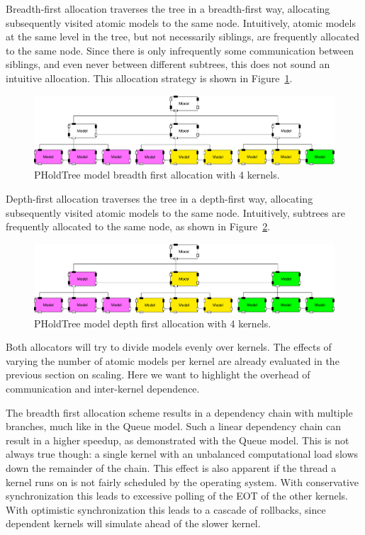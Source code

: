 Breadth-first allocation traverses the tree in a breadth-first way, allocating subsequently visited atomic models to the same node.
Intuitively, atomic models at the same level in the tree, but not necessarily siblings, are frequently allocated to the same node.
Since there is only infrequently some communication between siblings, and even never between different subtrees, this does not sound an intuitive allocation.
This allocation strategy is shown in Figure~\ref{fig:PholdTree_model_bfs}.

\begin{figure}
   \center
   \includegraphics[width=\columnwidth]{fig/pholdtree_alloc_BF.pdf}
   \caption{PHoldTree model breadth first allocation with 4 kernels.}
   \label{fig:PholdTree_model_bfs}
\end{figure}

Depth-first allocation traverses the tree in a depth-first way, allocating subsequently visited atomic models to the same node.
Intuitively, subtrees are frequently allocated to the same node, as shown in Figure~\ref{fig:PholdTree_model_dfs}.

\begin{figure}
   \center
   \includegraphics[width=\columnwidth]{fig/pholdtree_alloc_DF.pdf}
   \caption{PHoldTree model depth first allocation with 4 kernels.}
   \label{fig:PholdTree_model_dfs}
\end{figure}

Both allocators will try to divide models evenly over kernels.
The effects of varying the number of atomic models per kernel are already evaluated in the previous section on scaling.
Here we want to highlight the overhead of communication and inter-kernel dependence. 

The breadth first allocation scheme results in a dependency chain with multiple branches, much like in the Queue model.
Such a linear dependency chain can result in a higher speedup, as demonstrated with the Queue model.
This is not always true though: a single kernel with an unbalanced computational load slows down the remainder of the chain.
This effect is also apparent if the thread a kernel runs on is not fairly scheduled by the operating system.
With conservative synchronization this leads to excessive polling of the EOT of the other kernels.
With optimistic synchronization this leads to a cascade of rollbacks, since dependent kernels will simulate ahead of the slower kernel.

